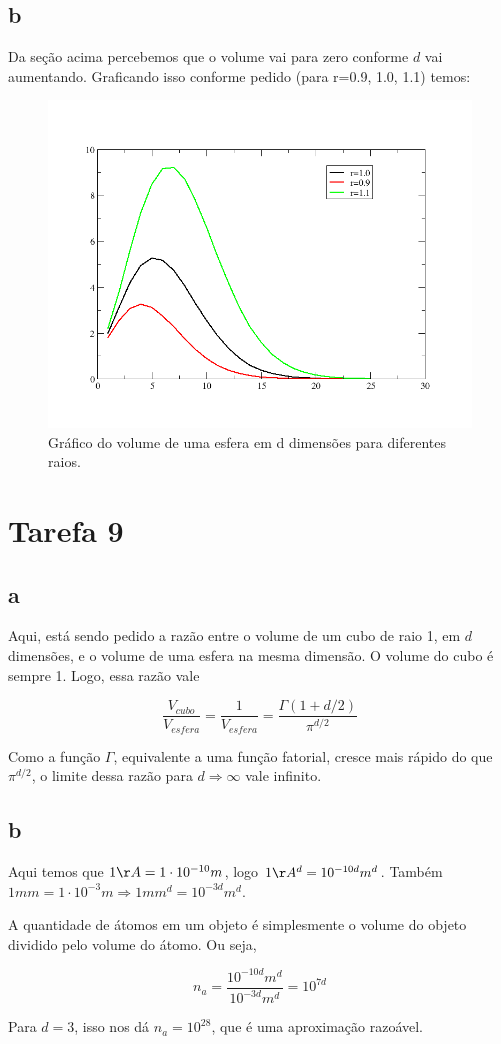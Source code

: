 \documentclass[12pt,a4paper]{article}
\begin{document}
\subsection{b}
Da seção acima percebemos que o volume vai para zero conforme $d$ vai aumentando. Graficando isso conforme pedido (para r=0.9, 1.0, 1.1) temos:

\begin{figure}[H]
\centering
\includegraphics[width=\linewidth]{../tarefa-8-grafico}
\caption{Gráfico do volume de uma esfera em d dimensões para diferentes raios.}
\label{fig:tarefa-8-grafico}
\end{figure}

\section{Tarefa 9}

\subsection{a}
Aqui, está sendo pedido a razão entre o volume de um cubo de raio 1, em $d$ dimensões, e o volume de uma esfera na mesma dimensão. O volume do cubo é sempre 1. Logo, essa razão vale

\[ \frac{V_{cubo}}{V_{esfera}} = \frac{1}{V_{esfera}} = \frac{\Gamma(1 + d/2)}{\pi^{d/2}}\]

Como a função $\Gamma$, equivalente a uma função fatorial, cresce mais rápido do que $\pi^{d/2}$, o limite dessa razão para $d \Rightarrow \infty$ vale infinito.

\subsection{b}

Aqui temos que $1 \AA = 1\cdot10^{-10}m$, logo $1\AA^d = 10^{-10d}m^d$. Também $1 mm = 1\cdot10^{-3}m \Rightarrow 1 mm^d = 10^{-3d}m^d$.

A quantidade de átomos em um objeto é simplesmente o volume do objeto dividido pelo volume do átomo. Ou seja,

\[ n_a = \frac{10^{-10d}m^d}{10^{-3d}m^d} = 10^{7d} \]

Para $d=3$, isso nos dá $n_a=10^{28}$, que é uma aproximação razoável.
\end{document}
